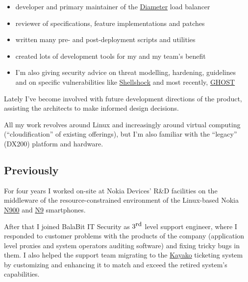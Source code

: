 \documentclass[a4paper,12pt]{article}
\newcommand{\compress}{\setlength\itemsep{-\parskip}}
\newenvironment{compressedItemize}{\begin{itemize}\compress}{\end{itemize}}
\begin{document}
\begin{compressedItemize}
\item	developer and primary maintainer of the
	\href{http://tools.ietf.org/html/rfc6733}{Diameter} load balancer
\item	reviewer of specifications, feature implementations and patches
\item	written many pre- and post-deployment scripts and utilities
\item	created lots of development tools for my and my team's benefit
\item	I'm also giving security advice on threat modelling, hardening,
	guidelines \\ and on specific vulnerabilities like
	\href{http://cve.mitre.org/cgi-bin/cvename.cgi?name=CVE-2014-7169}%
	{Shellshock} and most recently,
	\href{http://cve.mitre.org/cgi-bin/cvename.cgi?name=CVE-2015-0235}%
	{GHOST}
\end{compressedItemize}

Lately I've become involved with future development directions of the
product, assisting the architects to make informed design decisions.

\medskip
All my work revolves around Linux and increasingly around virtual computing
(``cloudification'' of existing offerings), but I'm also familiar with the
``legacy'' (DX200) platform and hardware.

\subsection*{Previously}

For four years I worked on-site at \hypertarget{gadgets}{Nokia Devices'
R\&D facilities} on the middleware of the resource-constrained environment
of the Linux-based Nokia \href{http://maemo.org/intro/maemo_history}{N900}
and \href{http://en.wikipedia.org/wiki/Nokia_N9}{N9} smartphones.

\medskip
After that I joined BalaBit IT Security as $3^{\textrm{\small rd}}$ level
support engineer, where I responded to customer problems with the products
of the company (application level proxies and system operators auditing
software) and fixing tricky bugs in them.  I also helped the support team
migrating to the \href{http://www.kayako.com}{Kayako} ticketing system
by customizing and enhancing it to match and exceed the retired system's
capabilities.
\end{document}
